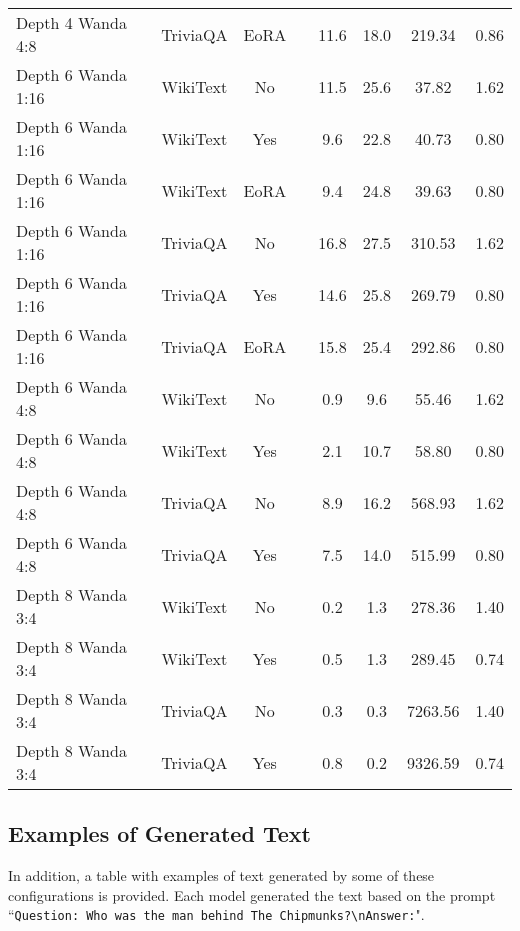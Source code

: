 \begin{longtable}{lcclcccc}
Depth 4 Wanda 4:8 & TriviaQA & EoRA & & 11.6 & 18.0 & 219.34 & 0.86 \\
Depth 6 Wanda 1:16 & WikiText & No & & 11.5 & 25.6 & 37.82 & 1.62 \\
Depth 6 Wanda 1:16 & WikiText & Yes & & 9.6 & 22.8 & 40.73 & 0.80 \\
Depth 6 Wanda 1:16 & WikiText & EoRA & & 9.4 & 24.8 & 39.63 & 0.80 \\
Depth 6 Wanda 1:16 & TriviaQA & No & & 16.8 & 27.5 & 310.53 & 1.62 \\
Depth 6 Wanda 1:16 & TriviaQA & Yes & & 14.6 & 25.8 & 269.79 & 0.80 \\
Depth 6 Wanda 1:16 & TriviaQA & EoRA & & 15.8 & 25.4 & 292.86 & 0.80 \\
Depth 6 Wanda 4:8 & WikiText & No & & 0.9 & 9.6 & 55.46 & 1.62 \\
Depth 6 Wanda 4:8 & WikiText & Yes & & 2.1 & 10.7 & 58.80 & 0.80 \\
Depth 6 Wanda 4:8 & TriviaQA & No & & 8.9 & 16.2 & 568.93 & 1.62 \\
Depth 6 Wanda 4:8 & TriviaQA & Yes & & 7.5 & 14.0 & 515.99 & 0.80 \\
Depth 8 Wanda 3:4 & WikiText & No & & 0.2 & 1.3 & 278.36 & 1.40 \\
Depth 8 Wanda 3:4 & WikiText & Yes & & 0.5 & 1.3 & 289.45 & 0.74 \\
Depth 8 Wanda 3:4 & TriviaQA & No & & 0.3 & 0.3 & 7263.56 & 1.40 \\
Depth 8 Wanda 3:4 & TriviaQA & Yes & & 0.8 & 0.2 & 9326.59 & 0.74 \\

\end{longtable}
\normalsize

\subsection{Examples of Generated Text}
In addition, a table with examples of text generated by some of these configurations is provided. Each model generated the text based on the prompt ``\texttt{Question: Who was the man behind The Chipmunks?\textbackslash nAnswer:}".

